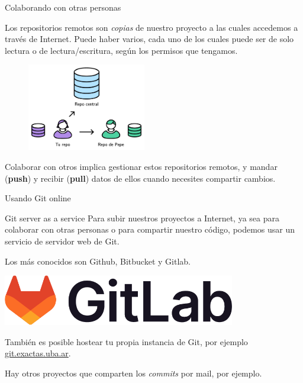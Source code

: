\begin{frame}{Colaborando con otras personas}

    Los repositorios remotos son \textit{copias} de nuestro proyecto a las cuales accedemos a través
    de Internet. Puede haber varios, cada uno de los cuales
    puede ser de solo lectura o de lectura/escritura, según los permisos que tengamos.

    \begin{figure}[ht]
        \begin{center}
            \includegraphics[height=1.5in]{images/repo-remoto.pdf}
        \end{center}
    \end{figure}

    Colaborar con otros implica gestionar estos repositorios remotos, y mandar (\textbf{push}) y recibir (\textbf{pull})
    datos de ellos cuando necesites compartir cambios.

\end{frame}

\begin{frame}{Usando Git online}
\begin{block}{Git server as a service}
    Para subir nuestros proyectos a Internet, ya sea para colaborar con otras personas o para compartir nuestro código, podemos usar un servicio de servidor web de Git.

    Los más conocidos son Github, Bitbucket y Gitlab. 
    \end{block}
    \begin{center}
        \includegraphics[width=4in]{images/gitlab-logo-100.png}
    \end{center}

    También es posible hostear tu propia instancia de Git, por ejemplo \href{https://git.exactas.uba.ar/}{git.exactas.uba.ar}.

    Hay otros proyectos que comparten los \textit{commits} por mail, por ejemplo.
\end{frame}

